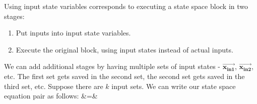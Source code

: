 
Using input state variables corresponds to executing a state space
block in two stages:
\begin{enumerate}
\vspace{\itemshrink} \item Put inputs into input state variables.

\vspace{\itemshrink} \item Execute the original block, using input states instead of
actual inputs.
\vspace{\itemshrink} \end{enumerate}

We can add additional stages by having multiple sets of input states -
$\vec{\mathbf{x_{in1}}}$, $\vec{\mathbf{x_{in2}}}$, etc. The
first set gets saved in the second set, the second set gets saved in
the third set, etc.  Suppose there are $k$ input sets. We can write
our state space equation pair as follows:
\starteqnstar
{} &\hspace{-6pt}=\hspace{-6pt}&  
